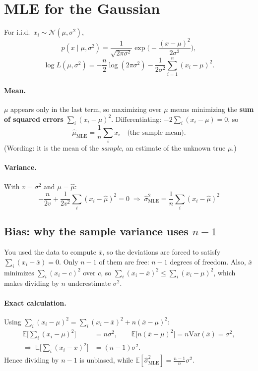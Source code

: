 \documentclass[11pt,a4paper]{article}
\newcommand{\E}{\mathbb{E}}
\newcommand{\Var}{\mathrm{Var}}
\begin{document}
\section{MLE for the Gaussian}
For i.i.d.\ $x_i\sim\mathcal N(\mu,\sigma^2)$,
\[
p(x\mid\mu,\sigma^2)=\frac{1}{\sqrt{2\pi\sigma^2}}\exp\!\Big(-\frac{(x-\mu)^2}{2\sigma^2}\Big),
\]
\[
\log L(\mu,\sigma^2)=-\frac n2\log(2\pi\sigma^2)-\frac{1}{2\sigma^2}\sum_{i=1}^n(x_i-\mu)^2 .
\]

\paragraph{Mean.} $\mu$ appears only in the last term, so maximizing over $\mu$ means minimizing the \textbf{sum of squared errors} $\sum_i(x_i-\mu)^2$. Differentiating: $-2\sum_i(x_i-\mu)=0$, so
\[
\hat\mu_{\text{MLE}}=\frac1n\sum_i x_i\quad\text{(the sample mean).}
\]
(Wording: it is the mean of the \emph{sample}, an estimate of the unknown true $\mu$.)

\paragraph{Variance.} With $v=\sigma^2$ and $\mu=\hat\mu$:
\[
-\frac{n}{2v}+\frac{1}{2v^2}\sum_i(x_i-\hat\mu)^2=0
\;\Rightarrow\;
\boxed{\hat\sigma^2_{\text{MLE}}=\frac1n\sum_i(x_i-\hat\mu)^2}
\]

\subsection{Bias: why the sample variance uses $n-1$}
\begin{keybox}
You used the data to compute $\bar x$, so the deviations are forced to satisfy $\sum_i(x_i-\bar x)=0$. Only $n-1$ of them are free: $n-1$ degrees of freedom. Also, $\bar x$ minimizes $\sum_i(x_i-c)^2$ over $c$, so
$\sum_i(x_i-\bar x)^2\le\sum_i(x_i-\mu)^2$, which makes dividing by $n$ underestimate $\sigma^2$.
\end{keybox}

\paragraph{Exact calculation.} Using $\sum_i(x_i-\mu)^2=\sum_i(x_i-\bar x)^2+n(\bar x-\mu)^2$:
\begin{align*}
\E\Big[\sum_i(x_i-\mu)^2\Big]&=n\sigma^2,\qquad
\E\big[n(\bar x-\mu)^2\big]=n\Var(\bar x)=\sigma^2,\\
\Rightarrow\;\E\Big[\sum_i(x_i-\bar x)^2\Big]&=(n-1)\sigma^2 .
\end{align*}
Hence dividing by $n-1$ is unbiased, while $\E[\hat\sigma^2_{\text{MLE}}]=\frac{n-1}{n}\sigma^2$.
\end{document}

